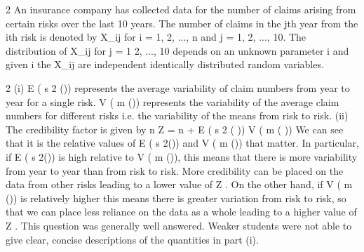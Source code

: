\documentclass[a4paper,12pt]{article}
\begin{document}
2 An insurance company has collected data for the number of claims arising from
certain risks over the last 10 years. The number of claims in the jth year from the ith
risk is denoted by X_{ij} for i = 1, 2, ..., n and j = 1, 2, ..., 10. The distribution of X_{ij} for
j = 1 2, ..., 10 depends on an unknown parameter \theta  i and given \theta  i the X_{ij} are
independent identically distributed random variables.



2
(i)
E ( s 2 (\theta )) represents the average variability of claim numbers from year to year
for a single risk.
V ( m (\theta )) represents the variability of the average claim numbers for different
risks i.e. the variability of the means from risk to risk.
(ii)
The credibility factor is given by
n
Z =
n +
E ( s 2 ( \theta  ))
V ( m ( \theta  ))
We can see that it is the relative values of E ( s 2(\theta )) and V ( m (\theta )) that matter. In
particular, if E ( s 2(\theta )) is high relative to V ( m (\theta )), this means that there is more
variability from year to year than from risk to risk. More credibility can be
placed on the data from other risks leading to a lower value of Z .
On the other hand, if V ( m (\theta )) is relatively higher this means there is greater
variation from risk to risk, so that we can place less reliance on the data as a
whole leading to a higher value of Z .
This question was generally well answered. Weaker students were not able to
give clear, concise descriptions of the quantities in part (i).
\end{document}
